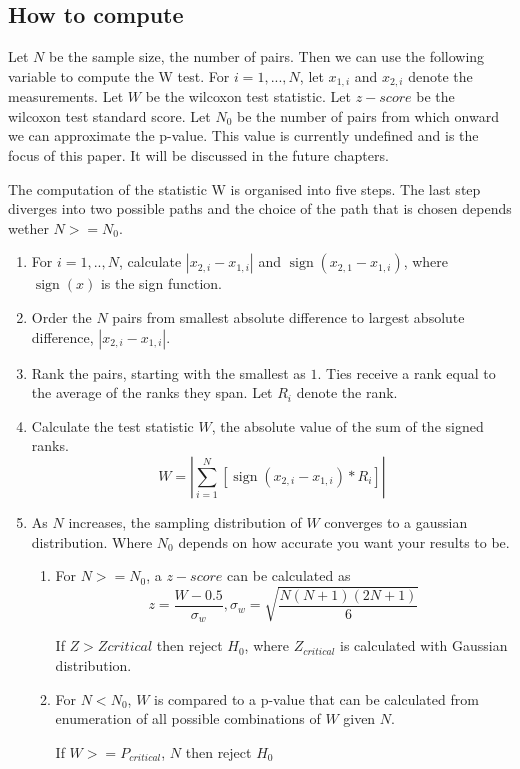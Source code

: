 \documentclass[12pt]{article}
\DeclareMathOperator{\sign}{sign}
\begin{document}
\subsection{How to compute}
Let $N$ be the sample size, the number of pairs. Then we can use the following variable to compute the W test. For $i=1,...,N$, let $x_{1, i}$ and $x_{2, i}$ denote the measurements.
Let $W$ be the wilcoxon test statistic.
Let $z-score$ be the wilcoxon test standard score.
Let $N_0$ be the number of pairs from which onward we can approximate the p-value. This value is currently undefined and is the focus of this paper. It will be discussed in the future chapters.

The computation of the statistic W is organised into five steps. The last step diverges into two possible paths and the choice of the path that is chosen depends wether $N  >= N_0$.

\begin{enumerate}
\item
For $i=1, .., N$, calculate $|x_{2,i} - x_{1,i}|$ and $\sign(x_{2,1} - x_{1,i})$, where $\sign(x)$ is the sign function.
\item
Order the $N$ pairs from smallest absolute difference to largest absolute difference, $|x_{2,i} - x_{1,i}|$.
\item
Rank the pairs, starting with the smallest as $1$. Ties receive a rank equal to the average of the ranks they span. Let $R_i$ denote the rank.
\item
Calculate the test statistic $W$, the absolute value of the sum of the signed ranks.
\begin{equation}
  W=|\sum\limits_{i=1}^{N} [\sign(x_{2,i} - x_{1,i})*R_i]|
\end{equation}

\item
As $N$ increases, the sampling distribution of $W$ converges to a gaussian distribution. Where $N_0$ depends on how accurate you want your results to be.
\begin{enumerate}
\item
For $N >= N_0$, a $z-score$ can be calculated as
\begin{equation}
  z=\frac{W-0.5}{\sigma_w},\sigma_w = \sqrt{\frac{N(N + 1)(2N + 1)}{6}}
\end{equation}

If $Z > Zcritical$ then reject $H_0$, where $Z_{critical}$ is calculated with Gaussian distribution.

\item
For $N < N_0$, $W$  is compared to a p-value that can be calculated from enumeration of all possible combinations of $W$ given $N$.

If $W >= P_{critical}$, $N$ then reject $H_0$
\end{enumerate}
\end{enumerate}
\end{document}
